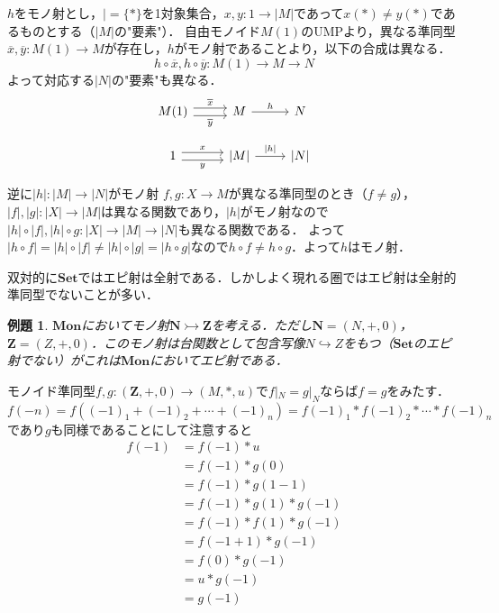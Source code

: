 \documentclass[dvipdfmx,a4j,10pt]{jsarticle}
\makeatletter
\theoremstyle{mystyle1}
\theoremstyle{mystyle2}
\newtheorem{ex}{例題}
\renewenvironment{proof}[1][\proofname]{\par
  \pushQED{\qed}%
  \normalfont
  \topsep6\p@\@plus6\p@ \trivlist
  \item[\hskip\labelsep{\bfseries\sffamily #1}]\ignorespaces
}{%
  \popQED\endtrivlist\@endpefalse
}
\renewcommand\proofname{証明}
\newcommand{\Set}{\mathbf{Set}}
\newcommand{\Mon}{\mathbf{Mon}}
\makeatother
\begin{document}
\begin{proof}
	$h$をモノ射とし，$|=\{*\}$を1対象集合，$x,y:1\to|M|$であって$x(*)\neq y(*)$であるものとする（$|M|$の"要素"）．
	自由モノイド$M(1)$のUMPより，異なる準同型$\overline{x},\overline{y}:M(1)\to M$が存在し，$h$がモノ射であることより，以下の合成は異なる．
	\[
		h\circ \overline{x},h\circ \overline{y}:M(1)\to M\to N
	\]
	よって対応する$|N|$の"要素"も異なる．
	\[
		\begin{tikzcd}
			M(1) \arrow[r,yshift=0.7ex,"\overline{x}"] \arrow[r,yshift=-0.7ex,"\overline{y}"'] & M \arrow[r,"h"] & N \\
			1 \arrow[r,yshift=0.7ex,"x"] \arrow[r,yshift=-0.7ex,"y"'] & {|M|} \arrow[r,"{|h|}"] & {|N|}
		\end{tikzcd}
	\]

	逆に$|h|:|M|\to |N|$がモノ射
	$f,g:X\to M$が異なる準同型のとき（$f\neq g$），$|f|,|g|:|X|\to|M|$は異なる関数であり，$|h|$がモノ射なので$|h|\circ|f|,|h|\circ g:|X|\to |M|\to |N|$も異なる関数である．
	よって$|h\circ f|=|h|\circ |f|\neq |h|\circ |g|=|h\circ g|$なので$h\circ f\neq h\circ g$．よって$h$はモノ射．
\end{proof}

双対的に$\Set$ではエピ射は全射である．しかしよく現れる圏ではエピ射は全射的準同型でないことが多い．

\begin{ex}
	$\Mon$においてモノ射$\mathbf{N}\rightarrowtail \mathbf{Z}$を考える．ただし$\mathbf{N}=(N,+,0)$，$\mathbf{Z}=(Z,+,0)$．このモノ射は台関数として包含写像$N\hookrightarrow Z$をもつ（$\Set$のエピ射でない）がこれは$\Mon$においてエピ射である．
\end{ex}

\begin{proof}
	モノイド準同型$f,g:(\mathbf{Z},+,0)\to(M,*,u)$で$f|_N=g|_N$ならば$f=g$をみたす．
	\[
		f(-n)=f((-1)_1+(-1)_2+\cdots +(-1)_n)=f(-1)_1*f(-1)_2*\cdots *f(-1)_n
	\]
	であり$g$も同様であることにして注意すると
	\[
		\begin{split}
			f(-1)
			&=f(-1)*u \\
			&=f(-1)*g(0) \\
			&=f(-1)*g(1-1) \\
			&=f(-1)*g(1)*g(-1) \\
			&=f(-1)*f(1)*g(-1) \\
			&=f(-1+1)*g(-1) \\
			&=f(0)*g(-1) \\
			&=u*g(-1) \\
			&=g(-1)
		\end{split}
	\]
\end{proof}
\end{document}
